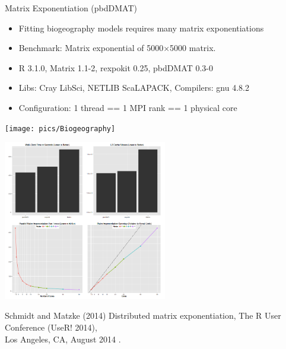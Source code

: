 \begin{frame}
  \begin{block}{Matrix Exponentiation (pbdDMAT)}
    \begin{minipage}{5cm}
      \begin{itemize}\tiny
      \item Fitting biogeography models requires many matrix exponentiations
      \item Benchmark: Matrix exponential of 5000$\times$5000 matrix.
      \item R 3.1.0, Matrix 1.1-2, rexpokit 0.25, pbdDMAT 0.3-0
      \item Libs: Cray LibSci, NETLIB ScaLAPACK, Compilers: gnu 4.8.2
      \item Configuration: 1 thread == 1 MPI rank == 1 physical core
      \end{itemize}
      \vspace{-4ex}
      \begin{center}
        \texttt{[image: pics/Biogeography]}
      \end{center}
    \end{minipage}
    \begin{minipage}{6.9cm}
      \includegraphics[trim=1mm 1mm 1mm 1mm,clip=true,height=7cm]{pics/MatExp}
    \end{minipage}
  \end{block}
  \begin{raggedright}\tiny
    Schmidt and Matzke (2014) Distributed matrix exponentiation, The R
    User Conference (UseR! 2014), \\[-2ex] Los Angeles, CA, August 2014 .
  \end{raggedright}
\end{frame}

